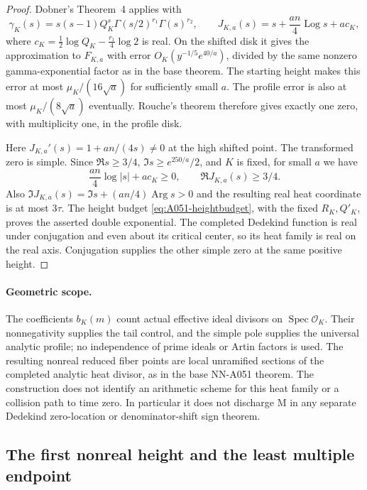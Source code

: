 \begin{proof}
Dobner's Theorem~4 applies with
\[
 \gamma_K(s)=s(s-1)Q_K^s\Gamma(s/2)^{r_1}\Gamma(s)^{r_2},
 \qquad
 J_{K,a}(s)=s+\frac{an}{4}\operatorname{Log}s+a c_K,
\]
where \(c_K=\tfrac12\log Q_K-\tfrac{r_1}{4}\log2\) is real.
On the shifted disk it gives the approximation to
\(F_{K,a}\) with error \(O_K(y^{-1/5}e^{40/a})\), divided by
the same nonzero gamma-exponential factor as in the base theorem.
The starting height makes this error at most
\(\mu_K/(16\sqrt a)\) for sufficiently small \(a\).
The profile error is also at most \(\mu_K/(8\sqrt a)\) eventually.
Rouche's theorem therefore gives exactly one zero, with
multiplicity one, in the profile disk.

Here \(J_{K,a}'(s)=1+an/(4s)\ne0\) at the high shifted point.
The transformed zero is simple. Since \(\Re s\ge3/4\),
\(\Im s\ge e^{250/a}/2\), and \(K\) is fixed, for small \(a\)
we have
\[
 \frac{an}{4}\log|s|+a c_K\ge0,
 \qquad \Re J_{K,a}(s)\ge3/4.
\]
Also \(\Im J_{K,a}(s)=\Im s+(an/4)\operatorname{Arg}s>0\)
and the resulting real heat coordinate is at most \(3\tau\).
The height budget \eqref{eq:A051-heightbudget}, with the fixed
\(R_K,Q'_K\), proves the asserted double exponential.
The completed Dedekind function is real under conjugation and
even about its critical center, so its heat family is real on the
real axis. Conjugation supplies the other simple zero at the same
positive height.
\end{proof}

\paragraph{Geometric scope.}
The coefficients \(b_K(m)\) count actual effective ideal divisors
on \(\operatorname{Spec}\mathcal O_K\). Their nonnegativity supplies
the tail control, and the simple pole supplies the universal
analytic profile; no independence of prime ideals or Artin factors
is used. The resulting nonreal reduced fiber points are local
unramified sections of the completed analytic heat divisor, as in
the base NN-A051 theorem. The construction does not identify an
arithmetic scheme for this heat family or a collision path to
time zero. In particular it does not discharge M in any separate
Dedekind zero-location or denominator-shift sign theorem.


\subsection{The first nonreal height and the least multiple endpoint}

